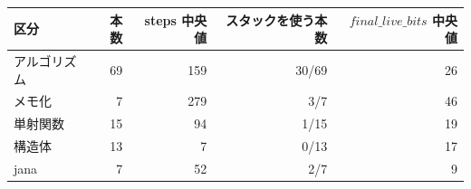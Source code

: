 \begin{tabular}{l r r r r}
\toprule
区分 & 本数 & steps 中央値 & スタックを使う本数 & $\mathit{final\_live\_bits}$ 中央値 \\
\midrule
アルゴリズム & 69 & 159 & 30/69 & 26 \\
メモ化 & 7 & 279 & 3/7 & 46 \\
単射関数 & 15 & 94 & 1/15 & 19 \\
構造体 & 13 & 7 & 0/13 & 17 \\
jana & 7 & 52 & 2/7 & 9 \\
\bottomrule
\end{tabular}
